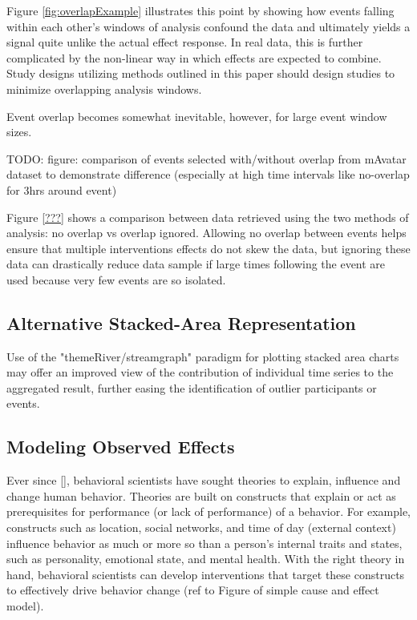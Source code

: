 \documentclass[review,journal]{vgtc}         %
\begin{document}
Figure \ref{fig:overlapExample} illustrates this point by showing how events falling within each other's windows of analysis confound the data and ultimately yields a signal quite unlike the actual effect response.
In real data, this is further complicated by the non-linear way in which effects are expected to combine.
Study designs utilizing methods outlined in this paper should design studies to minimize overlapping analysis windows.

Event overlap becomes somewhat inevitable, however, for large event window sizes.

TODO: figure: comparison of events selected with/without overlap from mAvatar dataset to demonstrate difference (especially at high time intervals like no-overlap for 3hrs around event)

Figure \ref{???} shows a comparison between data retrieved using the two methods of analysis: no overlap vs overlap ignored.
Allowing no overlap between events helps ensure that multiple interventions effects do not skew the data, but ignoring these data can drastically reduce data sample if large times following the event are used because very few events are so isolated.

\subsection{Alternative Stacked-Area Representation}
Use of the "themeRiver/streamgraph" \cite{havre200, byron2008} paradigm for plotting stacked area charts may offer an improved view of the contribution of individual time series to the aggregated result, further easing the identification of outlier participants or events.

\subsection{Modeling Observed Effects}
Ever since [], behavioral scientists have sought theories to explain, influence and change human behavior.
Theories are  built on constructs that explain or act as prerequisites for performance (or lack of performance) of a behavior.
For example, constructs such as location, social networks, and time of day (external context) influence behavior as much or more so than a person's internal traits and states, such as personality, emotional state, and mental health.
With the right theory in hand, behavioral scientists can develop interventions that target these constructs to effectively drive behavior change (ref to Figure of simple cause and effect model).
\end{document}
